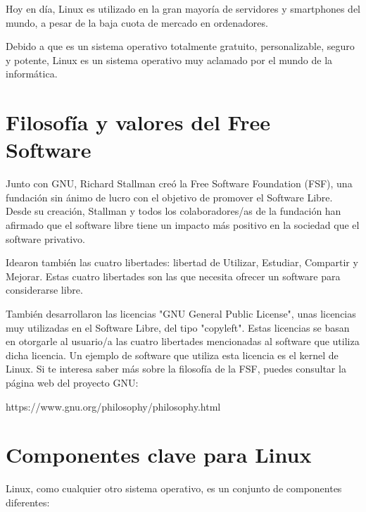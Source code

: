 Hoy en día, Linux es utilizado en la gran mayoría de servidores y smartphones del mundo, a pesar de la baja cuota de mercado en ordenadores.

Debido a que es un sistema operativo totalmente gratuito, personalizable, seguro y potente, Linux es un sistema operativo muy aclamado por el mundo de la informática.

\section{Filosofía y valores del Free Software}
Junto con GNU, Richard Stallman creó la Free Software Foundation (FSF), una fundación sin ánimo de lucro con el objetivo de promover el Software Libre. Desde su creación, Stallman y todos los colaboradores/as de la fundación han afirmado que el software libre tiene un impacto más positivo en la sociedad que el software privativo.

Idearon también las cuatro libertades: libertad de Utilizar, Estudiar, Compartir y Mejorar. Estas cuatro libertades son las que necesita ofrecer un software para considerarse libre.

También desarrollaron las licencias "GNU General Public License", unas licencias muy utilizadas en el Software Libre, del tipo "copyleft". Estas licencias se basan en otorgarle al usuario/a las cuatro libertades mencionadas al software que utiliza dicha licencia. Un ejemplo de software que utiliza esta licencia es el kernel de Linux.
Si te interesa saber más sobre la filosofía de la FSF, puedes consultar la página web del proyecto GNU:

\begin{center}
https://www.gnu.org/philosophy/philosophy.html
\end{center}

\section{Componentes clave para Linux}
Linux, como cualquier otro sistema operativo, es un conjunto de componentes diferentes:

